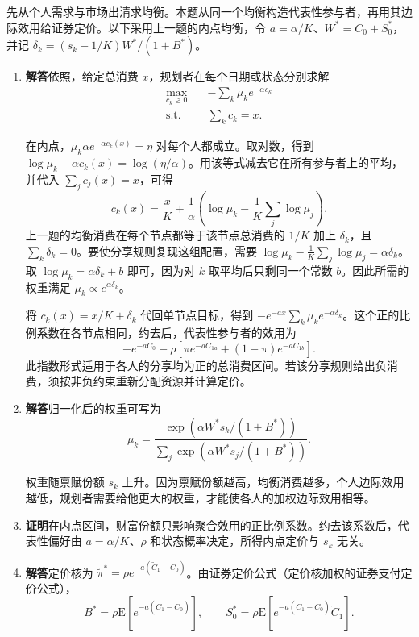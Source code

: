 \begin{solution}[blank-type=manual,blank-vsep=12\baselineskip]
 先从个人需求与市场出清求均衡。本题从同一个均衡构造代表性参与者，再用其边际效用给证券定价。以下采用上一题的内点均衡，令 $a=\alpha/K$、$W^*=C_0+S_0^*$，并记 $\delta_k=(s_k-1/K)W^*/(1+B^*)$。
\begin{enumerate}[label=(\alph*)]
 \item \textbf{解答}\quad 依照，给定总消费 $x$，规划者在每个日期或状态分别求解
 \[
 \begin{aligned}
 \max_{c_k\ge0}\quad &-\sum_k\mu_k e^{-\alpha c_k}\\
 \text{s.t.}\quad &\sum_k c_k=x.
 \end{aligned}
 \]

 在内点，$\mu_k\alpha e^{-\alpha c_k(x)}=\eta$ 对每个人都成立。取对数，得到 $\log\mu_k-\alpha c_k(x)=\log(\eta/\alpha)$。用该等式减去它在所有参与者上的平均，并代入 $\sum_jc_j(x)=x$，可得
 \[
 c_k(x)=\frac{x}{K}
        +\frac{1}{\alpha}\left(\log\mu_k-\frac1K\sum_j\log\mu_j\right).
 \]
 上一题的均衡消费在每个节点都等于该节点总消费的 $1/K$ 加上 $\delta_k$，且 $\sum_k\delta_k=0$。要使分享规则复现这组配置，需要 $\log\mu_k-\frac1K\sum_j\log\mu_j=\alpha\delta_k$。取 $\log\mu_k=\alpha\delta_k+b$ 即可，因为对 $k$ 取平均后只剩同一个常数 $b$。因此所需的权重满足 $\mu_k\propto e^{\alpha\delta_k}$。

 将 $c_k(x)=x/K+\delta_k$ 代回单节点目标，得到 $-e^{-ax}\sum_k\mu_ke^{-\alpha\delta_k}$。这个正的比例系数在各节点相同，约去后，代表性参与者的效用为
 \[
 -e^{-aC_0}-\rho[\pi e^{-aC_{1a}}+(1-\pi)e^{-aC_{1b}}].
 \]
 此指数形式适用于各人的分享均为正的总消费区间。若该分享规则给出负消费，须按非负约束重新分配资源并计算定价。

 \item \textbf{解答}\quad 归一化后的权重可写为
 \[
 \mu_k=\frac{\exp(\alpha W^*s_k/(1+B^*))}
 {\sum_j\exp(\alpha W^*s_j/(1+B^*))}.
 \]

 权重随禀赋份额 $s_k$ 上升。因为禀赋份额越高，均衡消费越多，个人边际效用越低，规划者需要给他更大的权重，才能使各人的加权边际效用相等。

 \item \textbf{证明}\quad 在内点区间，财富份额只影响聚合效用的正比例系数。约去该系数后，代表性偏好由 $a=\alpha/K$、$\rho$ 和状态概率决定，所得内点定价与 $s_k$ 无关。

 \item \textbf{解答}\quad 定价核为 $\widetilde\pi^*=\rho e^{-a(\widetilde C_1-C_0)}$。由\ifdefined\WJHandoutKnowledge {}\else 证券定价公式\fi（定价核加权的证券支付定价公式），
 \[
 B^*=\rho\mathrm E[e^{-a(\widetilde C_1-C_0)}],\qquad
 S_0^*=\rho\mathrm E[e^{-a(\widetilde C_1-C_0)}\widetilde C_1].
 \]


\end{enumerate}
\end{solution}

